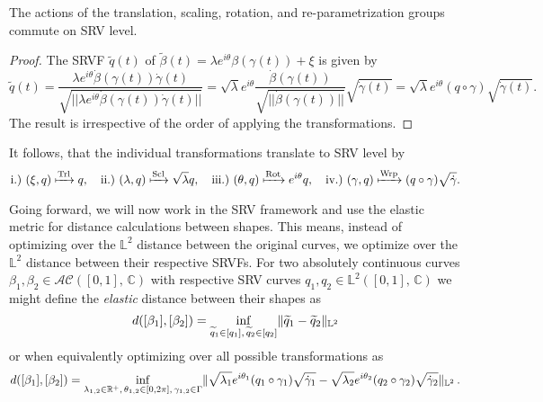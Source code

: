 \begin{lemma}
  The actions of the translation, scaling, rotation, and re-parametrization groups commute on SRV level.
\begin{proof} The SRVF $\widetilde q(t)$ of  $\widetilde\beta(t) = \lambda e^{i\theta}\beta\left(\gamma(t)\right) + \xi$ is given by
$$ \widetilde q (t) 
  = \frac{\lambda e^{i\theta} \dot\beta\left(\gamma(t)\right) \dot\gamma(t)}{\sqrt{||\lambda e^{i\theta} \dot\beta\left(\gamma(t)\right) \dot\gamma(t)||}} 
  = \sqrt{\lambda} e^{i\theta} \frac{\dot\beta\left(\gamma(t)\right)}{\sqrt{||\dot\beta\left(\gamma(t)\right)||}} \sqrt{\dot\gamma(t)} 
  = \sqrt\lambda e^{i\theta} \left( q \circ \gamma \right) \sqrt{\dot\gamma(t)}.$$
The result is irrespective of the order of applying the transformations.
\end{proof}
\end{lemma}
\begin{remark}
  It follows, that the individual transformations translate to SRV level by 
  $$\text{i.)} \,\,(\xi, q) \xmapsto{\text{Trl}} q,\quad 
    \text{ii.)} \,\, (\lambda, q) \xmapsto{\text{Scl}} \sqrt\lambda q,\quad
    \text{iii.)} \,\, (\theta, q) \xmapsto{\text{Rot}} e^{i\theta} q,\quad
    \text{iv.)} \,\, (\gamma, q) \xmapsto{\text{Wrp}} (q \circ \gamma) \sqrt{\dot\gamma}.$$
\end{remark}
Going forward, we will now work in the SRV framework and use the elastic metric for distance calculations between shapes.
This means, instead of optimizing over the $\mathbb{L}^2$ distance between the original curves, we optimize over the $\mathbb{L}^2$ distance between their respective SRVFs.
For two absolutely continuous curves $\beta_1, \beta_2 \in \mathcal{AC}([0,1],\,\mathbb{C})$ with respective SRV curves $q_1, q_2 \in \mathbb{L}^2([0,1],\,\mathbb{C})$ we might define the \textit{elastic} distance between their shapes as
$$d([\beta_1], [\beta_2]) = 
  \inf_{\widetilde q_1 \in [q_1],\,\widetilde q_2 \in [q_2]} \lVert \widetilde q_1 - \widetilde q_2 \rVert_{\mathbb{L}^2}$$
or when equivalently optimizing over all possible transformations as
$$d([\beta_1], [\beta_2]) = 
  \inf_{\lambda_{1,2} \in \mathbb{R}^+,\,\theta_{1,2} \in [0,2\pi],\, \gamma_{1,2} \in \Gamma} \lVert \sqrt{\lambda_1} e^{i\theta_1}(q_1 \circ \gamma_1) \sqrt{\dot\gamma_1} - \sqrt{\lambda_2} e^{i\theta_2}(q_2 \circ \gamma_2) \sqrt{\dot\gamma_2}\rVert_{\mathbb{L}^2}\,.$$

